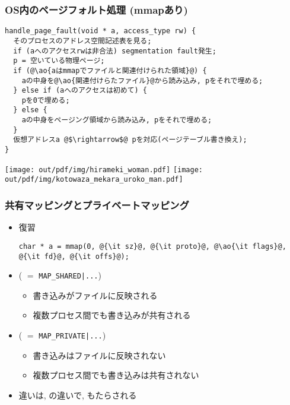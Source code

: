 \documentclass[12pt,dvipdfmx]{beamer}
\begin{document}
\begin{frame}[fragile]
  \frametitle{OS内のページフォルト処理 (mmapあり)}
\begin{lstlisting}
handle_page_fault(void * a, access_type rw) {
  そのプロセスのアドレス空間記述表を見る;
  if (aへのアクセスrwは非合法) segmentation fault発生;
  p = 空いている物理ページ;
  if (@\ao{aはmmapでファイルと関連付けられた領域}@) {
    aの中身を@\ao{関連付けらたファイル}@から読み込み, pをそれで埋める;
  } else if (aへのアクセスは初めて) {
    pを0で埋める;
  } else {
    aの中身をページング領域から読み込み, pをそれで埋める;
  }
  仮想アドレスa @$\rightarrow$@ pを対応(ページテーブル書き換え);
}
\end{lstlisting}
\begin{center}
  \texttt{[image: out/pdf/img/hirameki\_woman.pdf]}
  \texttt{[image: out/pdf/img/kotowaza\_mekara\_uroko\_man.pdf]}
\end{center}  
\end{frame}

\begin{frame}[fragile]
  \frametitle{共有マッピングとプライベートマッピング}
  \begin{itemize}
  \item 復習
    \begin{lstlisting}
char * a = mmap(0, @{\it sz}@, @{\it proto}@, @\ao{\it flags}@, @{\it fd}@, @{\it offs}@);
\end{lstlisting}

\item {} ( $=$ {\tt MAP\_SHARED|...})
  \begin{itemize}
  \item 書き込みがファイルに反映される
  \item 複数プロセス間でも書き込みが共有される
  \end{itemize}
\item {} ( $=$ {\tt MAP\_PRIVATE|...})
  \begin{itemize}
  \item 書き込みはファイルに反映されない
  \item 複数プロセス間でも書き込みは共有されない
  \end{itemize}
\item 違いは, の違いで, もたらされる
\end{itemize}
\end{frame}
\end{document}
